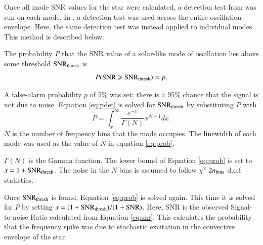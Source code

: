 \documentclass[a4paper,fleqn,usenatbib,useAMS]{mnras}
\begin{document}
Once all mode SNR values for the star were calculated, a detection test from \citet{chaplin_predicting_2011} was run on each mode. In \citet{chaplin_predicting_2011}, a detection test was used across the entire oscillation envelope. Here, the same detection test was instead applied to individual modes. This method is described below.

The probability $P$ that the SNR value of a solar-like mode of oscillation lies above some threshold ${\rm SNR_{thresh}}$ is
\begin{equation}
\label{eq:pdet}
{P \rm ({ SNR \geq SNR_{thresh}})} =  p .
\end{equation}

A false-alarm probability $p$ of 5\% was set; there is a 95\% chance that the signal is not due to noise. Equation \ref{eq:pdet} is solved for $\rm SNR_{thresh}$ by substituting $P$ with
\begin{equation}
\label{eq:prob}
P = \int_{x}^{\infty} \frac{e^{-x}}{\Gamma(N)} x^{N-1} dx .
\end{equation}
$N$ is the number of frequency bins that the mode occupies. The linewidth of each mode was used as the value of $N$ in equation \ref{eq:prob}.

$\Gamma(N)$ is the Gamma function. The lower bound of Equation \ref{eq:prob} is set to $x=1+{\rm SNR_{thresh}}$. The noise in the $N$ bins is assumed to follow $\chi^{2}$ $2n_{\rm bins}$ d.o.f statistics. 

Once $\rm SNR_{thresh}$ is found, Equation \ref{eq:prob} is solved again. This time it is solved for $P$ by setting $x=(1+{\rm SNR_{thresh}})/(1+{\rm SNR})$. Here, SNR is the observed Signal-to-noise Ratio calculated from Equation \ref{eq:snr}. This calculates the probability that the frequency spike was due to stochastic excitation in the convective envelope of the star.
\end{document}
